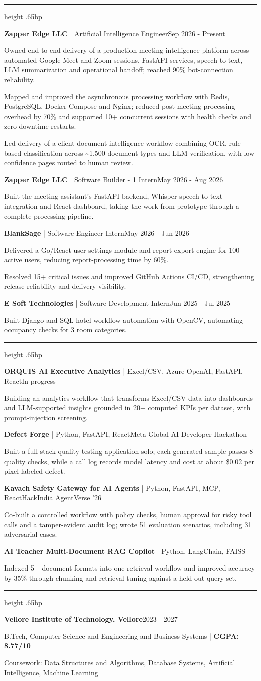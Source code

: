 \documentclass[10pt]{article}
\newcommand{\resumesection}[1]{\par\vspace{8bp}{\fontsize{11bp}{13bp}\selectfont\bfseries #1\par}\vspace{3bp}\hrule height .65bp\vspace{4bp}}
\newcommand{\entry}[2]{\par #1\hfill #2\par}
\newcommand{\nextentry}[2]{\par\vspace{5bp}\entry{#1}{#2}}
\newcommand{\bulletitem}[1]{\par\vspace{.6bp}\begingroup\hangindent=11.52bp\hangafter=1\noindent\makebox[11.52bp][l]{\textbullet}#1\par\endgroup}
\begin{document}
\resumesection{EXPERIENCE}
\entry{\textbf{Zapper Edge LLC} | Artificial Intelligence Engineer}{Sep 2026 - Present}
\bulletitem{Owned end-to-end delivery of a production meeting-intelligence platform across automated Google Meet and Zoom sessions, FastAPI services, speech-to-text, LLM summarization and operational handoff; reached 90\% bot-connection reliability.}
\bulletitem{Mapped and improved the asynchronous processing workflow with Redis, PostgreSQL, Docker Compose and Nginx; reduced post-meeting processing overhead by 70\% and supported 10+ concurrent sessions with health checks and zero-downtime restarts.}
\bulletitem{Led delivery of a client document-intelligence workflow combining OCR, rule-based classification across \textasciitilde1,500 document types and LLM verification, with low-confidence pages routed to human review.}
\nextentry{\textbf{Zapper Edge LLC} | Software Builder - 1 Intern}{May 2026 - Aug 2026}
\bulletitem{Built the meeting assistant's FastAPI backend, Whisper speech-to-text integration and React dashboard, taking the work from prototype through a complete processing pipeline.}
\nextentry{\textbf{BlankSage} | Software Engineer Intern}{May 2026 - Jun 2026}
\bulletitem{Delivered a Go/React user-settings module and report-export engine for 100+ active users, reducing report-processing time by 60\%.}
\bulletitem{Resolved 15+ critical issues and improved GitHub Actions CI/CD, strengthening release reliability and delivery visibility.}
\nextentry{\textbf{E Soft Technologies} | Software Development Intern}{Jun 2025 - Jul 2025}
\bulletitem{Built Django and SQL hotel workflow automation with OpenCV, automating occupancy checks for 3 room categories.}

\resumesection{PROJECT DELIVERY HIGHLIGHTS}
\entry{\textbf{ORQUIS AI Executive Analytics} | Excel/CSV, Azure OpenAI, FastAPI, React}{In progress}
\bulletitem{Building an analytics workflow that transforms Excel/CSV data into dashboards and LLM-supported insights grounded in 20+ computed KPIs per dataset, with prompt-injection screening.}
\nextentry{\textbf{Defect Forge} | Python, FastAPI, React}{Meta Global AI Developer Hackathon}
\bulletitem{Built a full-stack quality-testing application solo; each generated sample passes 8 quality checks, while a call log records model latency and cost at about \$0.02 per pixel-labeled defect.}
\nextentry{\textbf{Kavach Safety Gateway for AI Agents} | Python, FastAPI, MCP, React}{HackIndia AgentVerse '26}
\bulletitem{Co-built a controlled workflow with policy checks, human approval for risky tool calls and a tamper-evident audit log; wrote 51 evaluation scenarios, including 31 adversarial cases.}
\nextentry{\textbf{AI Teacher Multi-Document RAG Copilot} | Python, LangChain, FAISS}{}
\bulletitem{Indexed 5+ document formats into one retrieval workflow and improved accuracy by 35\% through chunking and retrieval tuning against a held-out query set.}

\resumesection{EDUCATION}
\entry{\textbf{Vellore Institute of Technology, Vellore}}{2023 - 2027}
B.Tech, Computer Science and Engineering and Business Systems | \textbf{CGPA: 8.77/10}\par
Coursework: Data Structures and Algorithms, Database Systems, Artificial Intelligence, Machine Learning
\end{document}
